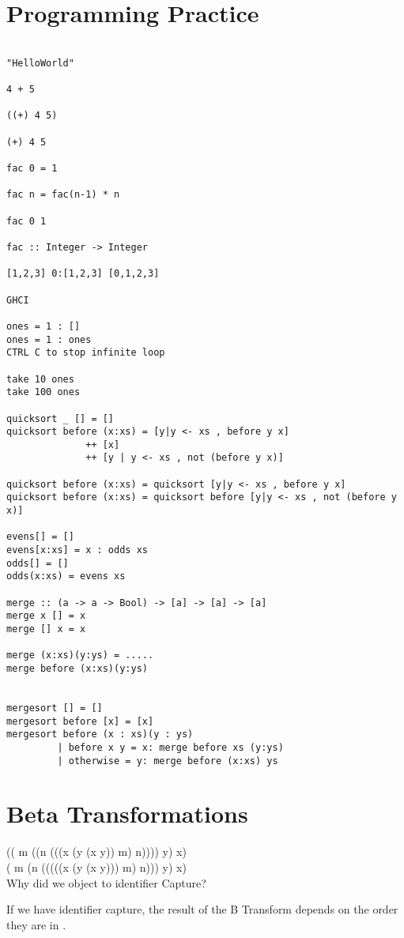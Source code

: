 \documentclass{article}
\begin{document}
\section*{Programming Practice}
\begin{verbatim}

"HelloWorld"    

4 + 5             

((+) 4 5)

(+) 4 5     

fac 0 = 1

fac n = fac(n-1) * n

fac 0 1

fac :: Integer -> Integer

[1,2,3] 0:[1,2,3] [0,1,2,3]

GHCI

ones = 1 : []
ones = 1 : ones
CTRL C to stop infinite loop

take 10 ones
take 100 ones

quicksort _ [] = []
quicksort before (x:xs) = [y|y <- xs , before y x]
              ++ [x] 
              ++ [y | y <- xs , not (before y x)]
            
quicksort before (x:xs) = quicksort [y|y <- xs , before y x]
quicksort before (x:xs) = quicksort before [y|y <- xs , not (before y x)]

evens[] = []
evens[x:xs] = x : odds xs
odds[] = []
odds(x:xs) = evens xs

merge :: (a -> a -> Bool) -> [a] -> [a] -> [a]
merge x [] = x
merge [] x = x

merge (x:xs)(y:ys) = ..... 
merge before (x:xs)(y:ys)


mergesort [] = []
mergesort before [x] = [x]
mergesort before (x : xs)(y : ys)
         | before x y = x: merge before xs (y:ys)
         | otherwise = y: merge before (x:xs) ys
  \end{verbatim}

\section*{Beta Transformations}

 (( \lambda m ((\lambda n (((\lambda x (\lambda y (x y)) m) n)))) y) x) \\
 ( \lambda m (\lambda n (((((\lambda x (\lambda y (x y))) m) n))) y) x)\\

Why did we object to identifier Capture?
\bigskip

If we have identifier capture, the result of the B Transform depends on the order they are in .\\
\end{document}
